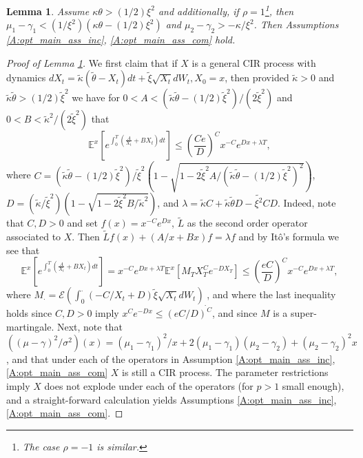 \documentclass[11pt, letterpaper]{amsart}
\newtheorem{lemma}[theorem]{Lemma}
\theoremstyle{definition}
\theoremstyle{remark}
\numberwithin{equation}{section}
\newcommand{\esp}{\mathbb{E}}
\newcommand{\espalt}[2]{\esp^{#1}\bra{#2}}
\newcommand{\EN}{\mathcal{E}}
\newcommand{\bra}[1]{\left[#1\right]}
\newcommand{\ito}{It\^{o}}
\begin{document}
\begin{lemma}\label{L:CIR_goes_through}
Assume $\kappa\theta > (1/2)\xi^2$ and additionally, if $\rho = 1$\footnote{The case $\rho = -1$ is similar.}, then $\mu_1-\gamma_1 < (1/\xi^2)(\kappa\theta-(1/2)\xi^2)$ and $\mu_2-\gamma_2 > -\kappa/\xi^2$. Then Assumptions \ref{A:opt_main_ass_inc}, \ref{A:opt_main_ass_com} hold.
\end{lemma}

\begin{proof}[Proof of Lemma \ref{L:CIR_goes_through}]
We first claim that if $X$ is a general CIR process with dynamics $dX_t = \tilde{\kappa}\left(\tilde{\theta}-X_t\right)dt + \tilde{\xi}\sqrt{X_t}dW_t, X_0 = x$, then provided $\tilde{\kappa} > 0$ and  $\tilde{\kappa}\tilde{\theta} > (1/2)\tilde{\xi}^2$  we have for $0 < A < (\tilde{\kappa}\tilde{\theta}-(1/2)\tilde{\xi}^2)/(2\tilde{\xi}^2)$ and $0 < B < \tilde{\kappa}^2/(2\tilde{\xi}^2)$ that
\begin{equation*}
\espalt{x}{e^{\int_0^T\left(\frac{A}{X_t} + BX_t\right)dt}} \leq \left(\frac{C e}{D}\right)^C x^{-C} e^{Dx + \lambda T},
\end{equation*}
where $C = (\tilde{\kappa}\tilde{\theta} - (1/2)\tilde{\xi}^2)/\tilde{\xi}^2\left(1 - \sqrt{1 - 2\tilde{\xi}^2A/(\tilde{\kappa}\tilde{\theta}-(1/2)\tilde{\xi}^2)^2}\right)$, $D = (\tilde{\kappa}/\tilde{\xi}^2)\left(1-\sqrt{1-2\tilde{\xi}^2B/\tilde{\kappa}^2}\right)$,
and $\lambda = \tilde{\kappa}C + \tilde{\kappa}\tilde{\theta}D - \tilde{\xi^2}{CD}$. Indeed, note that $C,D>0$ and set $f(x) = x^{-C}e^{Dx}$, $\tilde{L}$ as the second order operator associated to $X$.  Then $\tilde{L}f(x) + (A/x + Bx)f = \lambda f$ and by \ito's formula we see that
\begin{equation*}
\espalt{x}{e^{\int_0^T\left(\frac{A}{X_t} + BX_t\right)dt}} = x^{-C} e^{Dx + \lambda T}\espalt{x}{M_T X_T^C e^{-DX_T}} \leq \left(\frac{eC}{D}\right)^C x^{-C} e^{Dx+\lambda T},
\end{equation*}
where $M_\cdot = \EN\left(\int_0^\cdot \left(-C/X_t + D\right)\tilde{\xi}\sqrt{X_t}dW_t\right)_\cdot$, and where the last inequality holds since $C,D>0$ imply $x^{C}e^{-Dx} \leq (eC/D)^C$, and since $M$ is a super-martingale. Next, note that $((\mu-\gamma)^2/\sigma^2)(x) = (\mu_1-\gamma_1)^2/x + 2(\mu_1-\gamma_1)(\mu_2-\gamma_2) + (\mu_2-\gamma_2)^2x$, and that under each of the operators in Assumption \ref{A:opt_main_ass_inc}, \ref{A:opt_main_ass_com} $X$ is still a CIR process.  The parameter restrictions imply $X$ does not explode under each of the operators (for $p>1$ small enough), and a straight-forward calculation yields Assumptions \ref{A:opt_main_ass_inc}, \ref{A:opt_main_ass_com}.
\end{proof}
\end{document}
